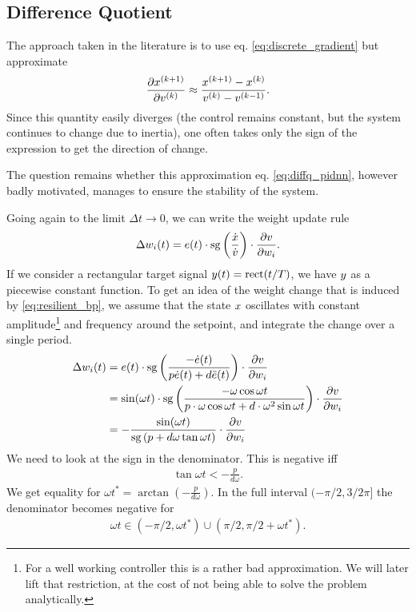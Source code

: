 \documentclass{article}
\begin{document}
  \subsection{Difference Quotient}
    The approach taken in the literature \cite{cong_novel_2005} is to use eq. \eqref{eq:discrete_gradient} but approximate 
    \begin{align}
        \frac{\partial {x}^{(k+1)}}{\partial {v}^{(k)}} \approx \frac{{x}^{(k+1)} - {x}^{(k)}}{{v}^{(k)} - {v}^{(k-1)}}.
    \end{align}
    Since this quantity easily diverges (the control remains constant, but the system continues to change due to inertia), 
    one often takes only the sign of the expression to get the direction of change. 

    The question remains whether this approximation eq. \eqref{eq:diffq_pidnn}, however badly motivated, manages to ensure
    the stability of the system.

    Going again to the limit $\Delta t \rightarrow 0$, we can write the weight update rule 
    \begin{align}
         \Delta w_i(t) = e(t) \cdot \operatorname{sg} \left(\frac{\dot{x}}{\dot{v}} \right) \cdot \frac{\partial v}{\partial w_i}.
         \label{eq:resilient_bp}
    \end{align}
    If we consider a rectangular target signal $y(t) = \mathrm{rect}(t/T)$, we have $y$ as a piecewise constant function. 
    To get an idea of the weight change that is induced by \eqref{eq:resilient_bp}, we assume that the state $x$ oscillates with constant amplitude\footnote{For a well working controller this is a rather bad approximation. We will later lift that restriction, at the cost of not being able to solve the problem analytically.} and frequency around the setpoint, and integrate the change over a single period.
    \begin{align}
         \Delta w_i(t) &= e(t) \cdot \operatorname{sg} \left( \frac{-\dot{e}(t)}{p \dot{e}(t) + d \ddot{e}(t)} \right)  \cdot \frac{\partial v}{\partial w_i} \label{eq:general_res_bp_wc}\\
         &= \sin(\omega t) \cdot  \mathrm{sg} \left(\frac{-\omega \cos{\omega t}}{p \cdot \omega \cos{\omega t} + d \cdot \omega^2 \sin{\omega t} } \right) \cdot \frac{\partial v}{\partial w_i} \nonumber \\
         &=-\frac{ \sin(\omega t) }{\mathrm{sg}\left(p + d \omega \tan{\omega t}\right) } \cdot \frac{\partial v}{\partial w_i}
    \end{align}
    We need to look at the sign in the denominator. This is negative iff
    \begin{align}
        \tan{\omega t} < -\frac{p}{d \omega}. \label{eq:sign_condition}
    \end{align}
    We get equality for $\omega t^* = \arctan \left(-\frac{p}{d \omega} \right)$. In the full interval $(-\pi/2, 3/2\pi]$ the denominator becomes negative for 
    \begin{align}
        \omega t \in (-\pi/2, \omega t^*) \cup (\pi/2, \pi/2+\omega t^*).
    \end{align}
\end{document}
